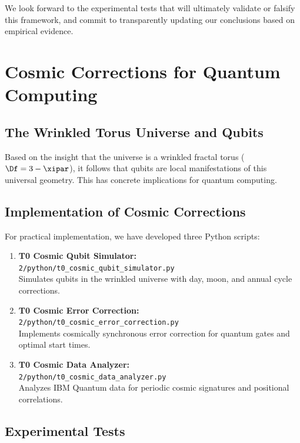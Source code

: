 We look forward to the experimental tests that will ultimately validate or falsify this framework, and commit to transparently updating our conclusions based on empirical evidence.

\section{Cosmic Corrections for Quantum Computing}
\label{sec:cosmic_corrections}

\subsection{The Wrinkled Torus Universe and Qubits}

Based on the insight that the universe is a wrinkled fractal torus 
($\Df = 3 - \xipar$), it follows that qubits are local manifestations of this 
universal geometry. This has concrete implications for quantum computing.

\subsection{Implementation of Cosmic Corrections}

For practical implementation, we have developed three Python scripts:

\begin{enumerate}
	\item \textbf{T0 Cosmic Qubit Simulator:} \\
	\texttt{2/python/t0\_cosmic\_qubit\_simulator.py} \\
	Simulates qubits in the wrinkled universe with day, moon, and annual cycle corrections.
	
	\item \textbf{T0 Cosmic Error Correction:} \\
	\texttt{2/python/t0\_cosmic\_error\_correction.py} \\
	Implements cosmically synchronous error correction for quantum gates and optimal start times.
	
	\item \textbf{T0 Cosmic Data Analyzer:} \\
	\texttt{2/python/t0\_cosmic\_data\_analyzer.py} \\
	Analyzes IBM Quantum data for periodic cosmic signatures and positional correlations.
\end{enumerate}

\subsection{Experimental Tests}

